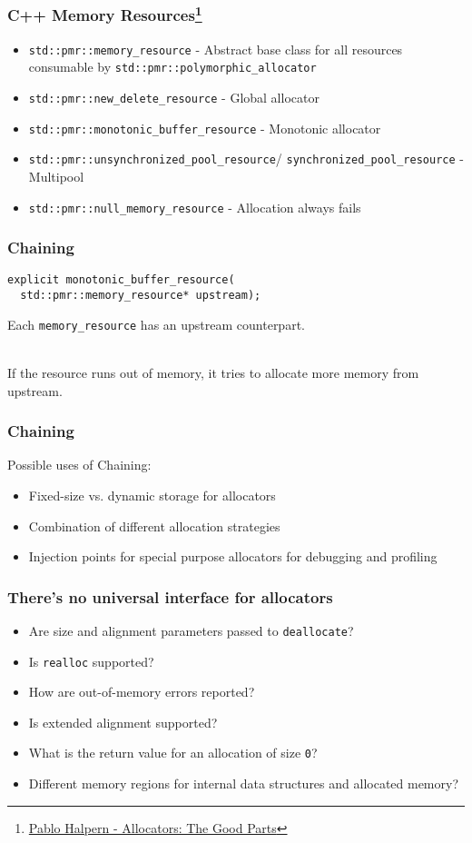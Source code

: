 \documentclass[aspectratio=43]{beamer}
\begin{document}
\begin{frame}[fragile]
  \frametitle{C++ Memory Resources\footnote{\href{https://www.youtube.com/watch?v=v3dz-AKOVL8}{Pablo Halpern - Allocators: The Good Parts}}}

  \begin{itemize}
  \item \texttt{std::pmr::memory\_resource} - Abstract base class for all resources consumable by \texttt{std::pmr::polymorphic\_allocator}
  \item \texttt{std::pmr::new\_delete\_resource} - Global allocator
  \item \texttt{std::pmr::monotonic\_buffer\_resource} - Monotonic allocator
  \item \texttt{std::pmr::unsynchronized\_pool\_resource}/ \texttt{synchronized\_pool\_resource} - Multipool
  \item \texttt{std::pmr::null\_memory\_resource} - Allocation always fails
  \end{itemize}
\end{frame}


\begin{frame}[fragile]
  \frametitle{Chaining}
  \begin{lstlisting}
explicit monotonic_buffer_resource(
  std::pmr::memory_resource* upstream);
  \end{lstlisting}

  Each \texttt{memory\_resource} has an upstream counterpart. \\~\

  If the resource runs out of memory, it tries to allocate more memory from upstream.
\end{frame}


\begin{frame}[fragile]
  \frametitle{Chaining}
  Possible uses of Chaining:
  \begin{itemize}
  \item Fixed-size vs. dynamic storage for allocators
  \item Combination of different allocation strategies
  \item Injection points for special purpose allocators for debugging and profiling
  \end{itemize}
\end{frame}


\begin{frame}
  \frametitle{There's no universal interface for allocators}

  \begin{itemize}
  \item Are size and alignment parameters passed to \texttt{deallocate}?
  \item Is \texttt{realloc} supported?
  \item How are out-of-memory errors reported?
  \item Is extended alignment supported?
  \item What is the return value for an allocation of size \texttt{0}?
  \item Different memory regions for internal data structures and allocated memory?
  \end{itemize}
\end{frame}
\end{document}
